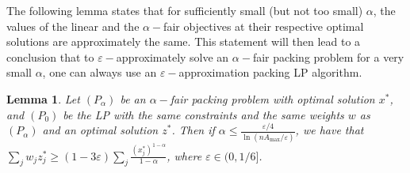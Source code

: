 \documentclass[11pt]{article}
\newtheorem{lemma}[theorem]{Lemma}
\newif\iffullpaper
\begin{document}
The following lemma states that for sufficiently small (but not too small) $\alpha$, the values of the linear and the $\alpha-$fair objectives at their respective optimal solutions are approximately the same. This statement will then lead to a conclusion that to $\varepsilon-$approximately solve an $\alpha-$fair packing problem for a very small $\alpha$, one can always use an $\varepsilon-$approximation packing LP algorithm. 
\begin{lemma}\label{lemma:LP-close-to-small-alpha-fair}
Let $(P_{\alpha})$ be an $\alpha-$fair packing problem with optimal solution $x^*$, and $(P_0)$ be the LP with the same constraints and the same weights $w$ as $(P_{\alpha})$ and an optimal solution $z^*$. Then if $\alpha \leq \frac{\varepsilon/4}{\ln(nA_{\max}/\varepsilon)}$, we have that $\sum_j w_j z_j^* \geq (1-3\varepsilon)\sum_j \frac{(x_j^*)^{1-\alpha}}{1-\alpha}$, where $\varepsilon\in(0, 1/6]$.
\end{lemma}
\iffullpaper
\end{document}
